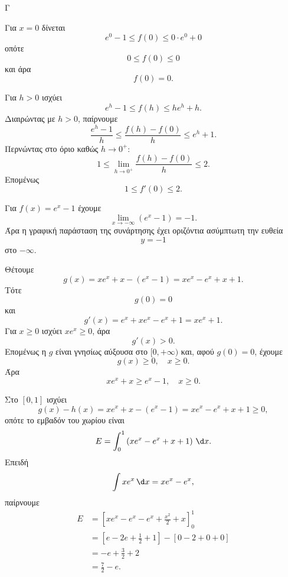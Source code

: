 \begin{thema}{Γ}
\begin{erwthma}
\item Για $x=0$ δίνεται
\[
e^0-1\le f(0)\le 0\cdot e^0+0
\]
οπότε
\[
0\le f(0)\le 0
\]
και άρα
\[
f(0)=0.
\]

Για $h>0$ ισχύει
\[
e^h-1\le f(h)\le he^h+h.
\]
Διαιρώντας με $h>0$, παίρνουμε
\[
\frac{e^h-1}{h}\le \frac{f(h)-f(0)}{h}\le e^h+1.
\]
Περνώντας στο όριο καθώς $h\to 0^+$:
\[
1\le \lim_{h\to 0^+}\frac{f(h)-f(0)}{h}\le 2.
\]
Επομένως
\[
1\le f'(0)\le 2.
\]

\item Για $f(x)=e^x-1$ έχουμε
\[
\lim_{x\to -\infty}(e^x-1)=-1.
\]
Άρα η γραφική παράσταση της συνάρτησης έχει οριζόντια ασύμπτωτη την ευθεία
\[
y=-1
\]
στο $-\infty$.

\item Θέτουμε
\[
g(x)=xe^x+x-(e^x-1)=xe^x-e^x+x+1.
\]
Τότε
\[
g(0)=0
\]
και
\[
g'(x)=e^x+xe^x-e^x+1=xe^x+1.
\]
Για $x\ge 0$ ισχύει $xe^x\ge 0$, άρα
\[
g'(x)>0.
\]
Επομένως η $g$ είναι γνησίως αύξουσα στο $[0,+\infty)$ και, αφού $g(0)=0$, έχουμε
\[
g(x)\ge 0,\quad x\ge 0.
\]
Άρα
\[
xe^x+x\ge e^x-1,\quad x\ge 0.
\]

\item Στο $[0,1]$ ισχύει
\[
g(x)-h(x)=xe^x+x-(e^x-1)=xe^x-e^x+x+1\ge 0,
\]
οπότε το εμβαδόν του χωρίου είναι
\[
E=\int_0^1 \left(xe^x-e^x+x+1\right)\,\d x.
\]
Επειδή
\[
\int xe^x\,\d x=xe^x-e^x,
\]
παίρνουμε
\begin{align*}
E
&=
\left[xe^x-e^x-e^x+\frac{x^2}{2}+x\right]_0^1\\
&=
\left[e-2e+\frac{1}{2}+1\right]-\left[0-2+0+0\right]\\
&=
-e+\frac{3}{2}+2\\
&=
\frac{7}{2}-e.
\end{align*}
\end{erwthma}
\end{thema}
